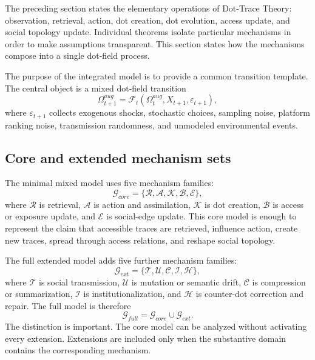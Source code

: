 \documentclass[11pt]{article}
\theoremstyle{remark}
\begin{document}
The preceding section states the elementary operations of Dot-Trace Theory: observation, retrieval, action, dot creation, dot evolution, access update, and social topology update. Individual theorems isolate particular mechanisms in order to make assumptions transparent. This section states how the mechanisms compose into a single dot-field process.

The purpose of the integrated model is to provide a common transition template. The central object is a mixed dot-field transition
\[
\Omega_{t+1}^{aug}=\mathscr F_t(\Omega_t^{aug},X_{t+1},\varepsilon_{t+1}),
\]
where \(\varepsilon_{t+1}\) collects exogenous shocks, stochastic choices, sampling noise, platform ranking noise, transmission randomness, and unmodeled environmental events.

\subsection{Core and extended mechanism sets}\label{core-and-extended-mechanism-sets}

The minimal mixed model uses five mechanism families:
\[
\mathcal G_{core}=\{\mathscr R,\mathscr A,\mathscr K,\mathscr B,\mathscr E\},
\]
where \(\mathscr R\) is retrieval, \(\mathscr A\) is action and assimilation, \(\mathscr K\) is dot creation, \(\mathscr B\) is access or exposure update, and \(\mathscr E\) is social-edge update. This core model is enough to represent the claim that accessible traces are retrieved, influence action, create new traces, spread through access relations, and reshape social topology.

The full extended model adds five further mechanism families:
\[
\mathcal G_{ext}=\{\mathscr T,\mathscr U,\mathscr C,\mathscr I,\mathscr H\},
\]
where \(\mathscr T\) is social transmission, \(\mathscr U\) is mutation or semantic drift, \(\mathscr C\) is compression or summarization, \(\mathscr I\) is institutionalization, and \(\mathscr H\) is counter-dot correction and repair. The full model is therefore
\[
\mathcal G_{full}=\mathcal G_{core}\cup\mathcal G_{ext}.
\]
The distinction is important. The core model can be analyzed without activating every extension. Extensions are included only when the substantive domain contains the corresponding mechanism.
\end{document}
